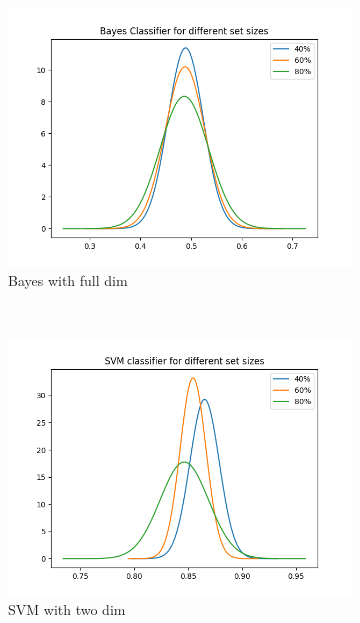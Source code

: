 \documentclass[12pt, a4paper]{article}
\begin{document}
\begin{figure}[H]
\begin{subfigure}{0.3\textwidth}
        \includegraphics[width=\textwidth]{recursos/1/bayes_full}
        \caption{Bayes with full dim}
    \end{subfigure}
    ~
    \begin{subfigure}{0.3\textwidth}
        \includegraphics[width=\textwidth]{recursos/1/svm_2}
        \caption{SVM with two dim}
    \end{subfigure}
    \begin{subfigure}{0.3\textwidth}

\end{subfigure}
\end{figure}
\end{document}
